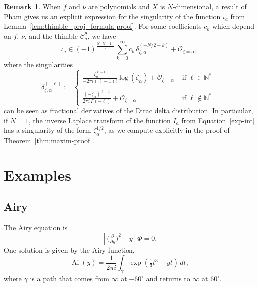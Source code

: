 \documentclass{article}
\DeclareMathOperator{\Ai}{Ai}
\theoremstyle{definition}
\newtheorem{remark}[definition]{Remark}
\theoremstyle{plain}
\begin{document}
\begin{remark}\label{rmk:Pham formula}
When $f$ and $\nu$ are polynomials and $X$ is $N$-dimensional, a result of Pham \cite[Equation 2.4, II partie]{pham} gives us an explicit expression for the singularity of the function $\iota_a$ from Lemma~\ref{lem:thimble_proj_formula-proof}. For some coefficients $c_k$ which depend on $f$, $\nu$, and the thimble $\mathcal{C}_a^\theta$, we have
\begin{equation}\label{eqn:Pham}
\iota_a \in (-1)^{\frac{N(N-1)}{2}}  \sum_{k=0}^\infty c_k\, \delta_{\zeta, \alpha}^{(-N/2 - k)} + \mathcal{O}_{\zeta = \alpha},
\end{equation}
where the singularities
\begin{equation*}
\delta_{\zeta,\alpha}^{(-\ell)}:=\begin{cases}
\displaystyle\frac{\zeta_\alpha^{\ell-1}}{-2\pi i(\ell-1)!}\log(\zeta_\alpha)+ \mathcal{O}_{\zeta = \alpha} & \text{ if } \ell\in\mathbb{N}^*\\
& \\
\displaystyle\frac{(-\zeta_\alpha)^{\ell-1}}{2\pi i\, \Gamma(-\ell)}+ \mathcal{O}_{\zeta = \alpha} & \text{ if } \ell\notin \mathbb{N}^* \,.
\end{cases}
\end{equation*}
can be seen as fractional derivatives of the Dirac delta distribution. In particular, if $N=1$, the inverse Laplace transform of the function $I_a$ from Equation~\eqref{exp-int} has a singularity of the form $\zeta_\alpha^{1/2}$, as we compute explicitly in the proof of Theorem~\ref{thm:maxim-proof}. %
\end{remark}
\section{Examples}\label{sec:examples}
%
\subsection{Airy}\label{sec:airy}
%
The Airy equation is
\begin{equation}\label{eqn:airy}
\left[\big(\tfrac{\partial}{\partial y}\big)^2 - y\right] \Phi = 0.
\end{equation}
One solution is given by the Airy function,
\[ \Ai(y) = \frac{1}{2\pi i} \int_\gamma \exp\left(\tfrac{1}{3}t^3 - yt\right)\,dt, \]
where $\gamma$ is a path that comes from $\infty$ at $-60^\circ$ and returns to $\infty$ at $60^\circ$.
\end{document}
